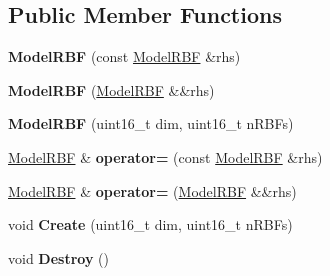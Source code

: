 \subsection*{Public Member Functions}
\begin{DoxyCompactItemize}
\item 
\hypertarget{struct_d_r_d_s_p_1_1_model_r_b_f_a522bcf2a1a005f1b6cd8b5c02ce3581d}{{\bfseries Model\-R\-B\-F} (const \hyperlink{struct_d_r_d_s_p_1_1_model_r_b_f}{Model\-R\-B\-F} \&rhs)}\label{struct_d_r_d_s_p_1_1_model_r_b_f_a522bcf2a1a005f1b6cd8b5c02ce3581d}

\item 
\hypertarget{struct_d_r_d_s_p_1_1_model_r_b_f_ae8b354a93aa99c49a47ff16b102318cf}{{\bfseries Model\-R\-B\-F} (\hyperlink{struct_d_r_d_s_p_1_1_model_r_b_f}{Model\-R\-B\-F} \&\&rhs)}\label{struct_d_r_d_s_p_1_1_model_r_b_f_ae8b354a93aa99c49a47ff16b102318cf}

\item 
\hypertarget{struct_d_r_d_s_p_1_1_model_r_b_f_af63987b1b17a01b305559ee063fee0e4}{{\bfseries Model\-R\-B\-F} (uint16\-\_\-t dim, uint16\-\_\-t n\-R\-B\-Fs)}\label{struct_d_r_d_s_p_1_1_model_r_b_f_af63987b1b17a01b305559ee063fee0e4}

\item 
\hypertarget{struct_d_r_d_s_p_1_1_model_r_b_f_a1ffbbfde016961350a833e6c1c0195fb}{\hyperlink{struct_d_r_d_s_p_1_1_model_r_b_f}{Model\-R\-B\-F} \& {\bfseries operator=} (const \hyperlink{struct_d_r_d_s_p_1_1_model_r_b_f}{Model\-R\-B\-F} \&rhs)}\label{struct_d_r_d_s_p_1_1_model_r_b_f_a1ffbbfde016961350a833e6c1c0195fb}

\item 
\hypertarget{struct_d_r_d_s_p_1_1_model_r_b_f_a93d779d4a6d429230f70c977758f3c69}{\hyperlink{struct_d_r_d_s_p_1_1_model_r_b_f}{Model\-R\-B\-F} \& {\bfseries operator=} (\hyperlink{struct_d_r_d_s_p_1_1_model_r_b_f}{Model\-R\-B\-F} \&\&rhs)}\label{struct_d_r_d_s_p_1_1_model_r_b_f_a93d779d4a6d429230f70c977758f3c69}

\item 
\hypertarget{struct_d_r_d_s_p_1_1_model_r_b_f_a12e7074523536761287d718afb705ba6}{void {\bfseries Create} (uint16\-\_\-t dim, uint16\-\_\-t n\-R\-B\-Fs)}\label{struct_d_r_d_s_p_1_1_model_r_b_f_a12e7074523536761287d718afb705ba6}

\item 
\hypertarget{struct_d_r_d_s_p_1_1_model_r_b_f_ae0cec70852be0d9ed29fd6e23c08f94f}{void {\bfseries Destroy} ()}\label{struct_d_r_d_s_p_1_1_model_r_b_f_ae0cec70852be0d9ed29fd6e23c08f94f}


\end{DoxyCompactItemize}
